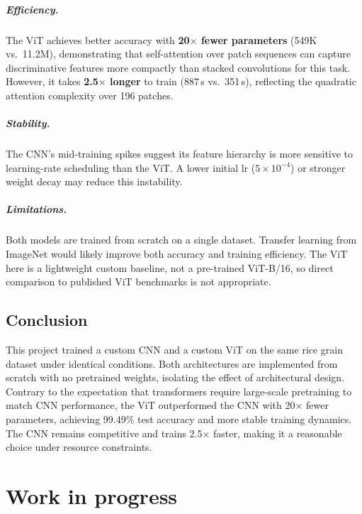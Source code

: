 \paragraph{Efficiency.}
The ViT achieves better accuracy with \textbf{20$\times$ fewer parameters}
(549K vs.\ 11.2M), demonstrating that self-attention over patch sequences can
capture discriminative features more compactly than stacked convolutions for
this task. However, it takes \textbf{2.5$\times$ longer} to train (887\,s vs.\
351\,s), reflecting the quadratic attention complexity over 196 patches.

\paragraph{Stability.}
The CNN's mid-training spikes suggest its feature hierarchy is more sensitive to
learning-rate scheduling than the ViT. A lower initial lr ($5\times10^{-4}$) or
stronger weight decay may reduce this instability.

\paragraph{Limitations.}
Both models are trained from scratch on a single dataset. Transfer learning from
ImageNet would likely improve both accuracy and training efficiency. The ViT here
is a lightweight custom baseline, not a pre-trained ViT-B/16, so direct
comparison to published ViT benchmarks is not appropriate.

\section*{Conclusion}

This project trained a custom CNN and a custom ViT on the same rice grain
dataset under identical conditions. Both architectures are implemented from
scratch with no pretrained weights, isolating the effect of architectural design.
Contrary to the expectation that transformers require large-scale pretraining to
match CNN performance, the ViT outperformed the CNN with 20$\times$ fewer
parameters, achieving 99.49\% test accuracy and more stable training dynamics.
The CNN remains competitive and trains 2.5$\times$ faster, making it a
reasonable choice under resource constraints.

\clearpage

\chapter{Work in progress}
